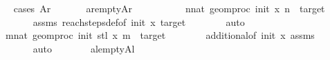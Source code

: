 \begin{isabellebody}
%
\isadelimproof
\isanewline
\ \ %
\endisadelimproof
%
\isatagproof
{}\isamarkupfalse%
\ {\isacharparenleft}{\kern0pt}cases\ {\isachardoublequoteopen}Ar{\isacharequal}{\kern0pt}\ {\isacharbraceleft}{\kern0pt}{\isacharbraceright}{\kern0pt}{\isachardoublequoteclose}{\isacharparenright}{\kern0pt}\isanewline
\ \ \ \ \isamarkupfalse%
\ ar{\isacharunderscore}{\kern0pt}empty{\isacharcolon}{\kern0pt}{\isachardoublequoteopen}Ar\ {\isacharequal}{\kern0pt}\ {\isacharbraceleft}{\kern0pt}{\isacharbraceright}{\kern0pt}{\isachardoublequoteclose}\isanewline
\ \ \ \ \isamarkupfalse%
\ \isamarkupfalse%
\ {\isachardoublequoteopen}{\isasymnot}\ {\isacharparenleft}{\kern0pt}{\isasymexists}n{\isacharcolon}{\kern0pt}{\isacharcolon}{\kern0pt}nat{\isachardot}{\kern0pt}\ geom{\isacharunderscore}{\kern0pt}proc\ init\ x\ n\ {\isasymin}\ {\isacharbraceleft}{\kern0pt}{}{\isacharcomma}{\kern0pt}target{\isacharbraceright}{\kern0pt}{\isacharparenright}{\kern0pt}{\isachardoublequoteclose}\isanewline
\ \ \ \ \ \ \isamarkupfalse%
\ assms{\isacharparenleft}{\kern0pt}{}{\isacharparenright}{\kern0pt}\ reach{\isacharunderscore}{\kern0pt}steps{\isacharunderscore}{\kern0pt}def{\isacharbrackleft}{\kern0pt}of\ init\ x\ target{\isacharbrackright}{\kern0pt}\isanewline
\ \ \ \ \ \ \isamarkupfalse%
\ auto\isanewline
\ \ \ \ \isamarkupfalse%
\ \isamarkupfalse%
\ {\isachardoublequoteopen}{\isasymnot}\ {\isacharparenleft}{\kern0pt}{\isasymexists}m{\isacharcolon}{\kern0pt}{\isacharcolon}{\kern0pt}nat{\isachardot}{\kern0pt}\ geom{\isacharunderscore}{\kern0pt}proc\ init{\isacharprime}{\kern0pt}\ {\isacharparenleft}{\kern0pt}stl\ x{\isacharparenright}{\kern0pt}\ m\ {\isasymin}\ {\isacharbraceleft}{\kern0pt}{}{\isacharcomma}{\kern0pt}target{\isacharbraceright}{\kern0pt}{\isacharparenright}{\kern0pt}{\isachardoublequoteclose}\isanewline
\ \ \ \ \ \ \isamarkupfalse%
\ additional{}{\isacharbrackleft}{\kern0pt}of\ init\ x{\isacharbrackright}{\kern0pt}\ assms{\isacharparenleft}{\kern0pt}{}{\isacharparenright}{\kern0pt}\isanewline
\ \ \ \ \ \ \isamarkupfalse%
\ auto\isanewline
\ \ \ \ \isamarkupfalse%
\ \isamarkupfalse%
\ al{\isacharunderscore}{\kern0pt}empty{\isacharcolon}{\kern0pt}{\isachardoublequoteopen}Al\ {\isacharequal}{\kern0pt}\ {\isacharbraceleft}{\kern0pt}{\isacharbraceright}{\kern0pt}{\isachardoublequoteclose}\isanewline
\ \ \ \ \ \ \isamarkupfalse%

\end{isabellebody}
